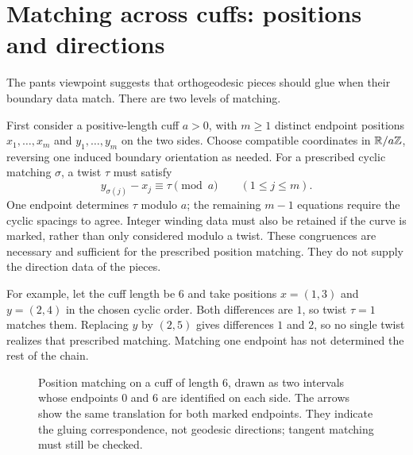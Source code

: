 \section{Matching across cuffs: positions and directions}
\label{sec:matching}

The pants viewpoint suggests that orthogeodesic pieces should glue when
their boundary data match. There are two levels of matching.

First consider a positive-length cuff $a>0$, with $m\geq1$ distinct
endpoint positions $x_1,\ldots,x_m$ and $y_1,\ldots,y_m$ on the two sides.
Choose compatible
coordinates in $\mathbb R/a\mathbb Z$, reversing one induced boundary orientation
as needed. For a prescribed cyclic matching $\sigma$, a twist $\tau$
must satisfy
\begin{equation}
 y_{\sigma(j)}-x_j\equiv\tau\pmod a
       \qquad(1\le j\le m).
 \label{eq:endpointmatch}
\end{equation}
One endpoint determines $\tau$ modulo $a$; the remaining $m-1$ equations
require the cyclic spacings to agree. Integer winding data must also be
retained if the curve is marked, rather than only considered modulo a
twist. These congruences are necessary and sufficient for the prescribed
position matching. They do not supply the direction data of the pieces.

For example, let the cuff length be $6$ and take positions
$x=(1,3)$ and $y=(2,4)$ in the chosen cyclic order. Both
differences are $1$, so twist $\tau=1$ matches them. Replacing
$y$ by $(2,5)$ gives differences $1$ and $2$, so no single
twist realizes that prescribed matching. Matching one endpoint
has not determined the rest of the chain.

\begin{figure}[htbp]
\centering
{}
\caption*{Position matching on a cuff of length $6$, drawn as two
intervals whose endpoints $0$ and $6$ are identified on each side.
The arrows show the same translation for both marked endpoints.
They indicate the gluing correspondence, not geodesic directions;
tangent matching must still be checked.}
\end{figure}

